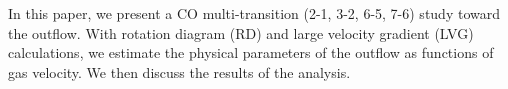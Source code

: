 In this paper, we present a CO multi-transition (2-1, 3-2, 6-5, 7-6) study toward the  outflow. With rotation diagram (RD) and large velocity gradient (LVG) calculations, we estimate the physical parameters of the outflow as functions of gas velocity. We then discuss the results of the analysis.


